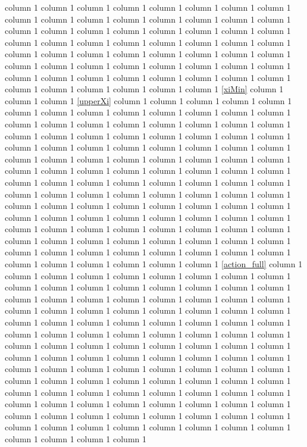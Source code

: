 \documentclass[a4paper,11pt]{article}
\begin{document}
  column 1  column 1  column 1  column 1  column 1  column 1  column 1  column 1  column 1  column 1   column 1   column 1  column 1  column 1  column 1  column 1   column 1  column 1  column 1  column 1     column 1  column 1  column 1  column 1  column 1  column 1  column 1  column 1  column 1   column 1  column 1  column 1  column 1  column 1  column 1  column 1  column 1  column 1  column 1  column 1  column 1  column 1  column 1  column 1  column 1  column 1  column 1  column 1  column 1  column 1  column 1  column 1  column 1  column 1  column 1  column 1   column 1  column 1  column 1  column 1   column 1  column 1 \ref{xiMin}  column 1  column 1  column 1 \ref{upperXi}  column 1  column 1  column 1     column 1  column 1  column 1  column 1  column 1  column 1  column 1  column 1  column 1  column 1  column 1  column 1  column 1  column 1  column 1  column 1  column 1  column 1   column 1  column 1  column 1  column 1  column 1  column 1  column 1  column 1  column 1  column 1  column 1  column 1  column 1  column 1   column 1  column 1  column 1  column 1  column 1  column 1  column 1  column 1  column 1  column 1  column 1  column 1   column 1  column 1  column 1  column 1  column 1  column 1  column 1  column 1  column 1  column 1  column 1   column 1  column 1  column 1  column 1  column 1  column 1  column 1  column 1  column 1  column 1  column 1  column 1  column 1  column 1  column 1  column 1 \cite{Froggatt:1995rt}  column 1  column 1  column 1  column 1  column 1 \cite{0912.0208}  column 1     column 1  column 1  column 1  column 1  column 1  column 1  column 1  column 1  column 1  column 1  column 1  column 1   column 1 \cite{2001.09088}  column 1  column 1  column 1  column 1  column 1  column 1  column 1  column 1  column 1  column 1  column 1  column 1  column 1  column 1  column 1  column 1  column 1  column 1  column 1  column 1  column 1  column 1 \eqref{action_full}  column 1   column 1  column 1  column 1  column 1  column 1  column 1  column 1  column 1  column 1  column 1  column 1  column 1  column 1  column 1  column 1  column 1  column 1  column 1  column 1  column 1  column 1  column 1  column 1  column 1  column 1  column 1  column 1  column 1  column 1  column 1  column 1  column 1  column 1  column 1  column 1  column 1  column 1  column 1  column 1  column 1  column 1  column 1  column 1  column 1  column 1  column 1 \cite{2001.09088}  column 1     column 1  column 1  column 1  column 1  column 1  column 1  column 1  column 1  column 1  column 1  column 1  column 1  column 1  column 1  column 1  column 1  column 1  column 1  column 1  column 1  column 1  column 1  column 1  column 1  column 1  column 1  column 1  column 1  column 1  column 1  column 1  column 1  column 1  column 1  column 1 \cite{Asaka:2005an, Asaka:2005pn}  column 1  column 1  column 1  column 1  column 1  column 1  column 1  column 1  column 1  column 1  column 1  column 1  column 1  column 1  column 1  column 1  column 1  column 1  column 1  column 1  column 1  column 1  column 1  column 1 \cite{1005.3497, 1010.1415, 1103.5963}  column 1  column 1  column 1  column 1  column 1  column 1  column 1  column 1  column 1  column 1  
\end{document}
